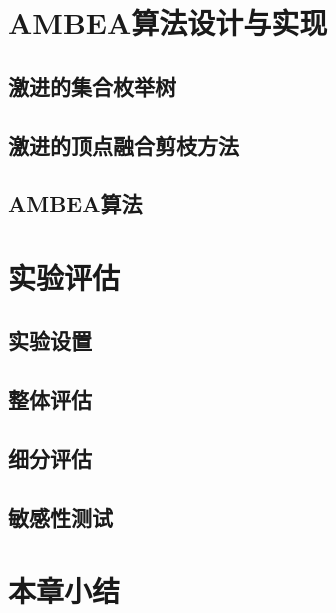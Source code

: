 \section{AMBEA算法设计与实现}

\subsection{激进的集合枚举树}

\subsection{激进的顶点融合剪枝方法}

\subsection{AMBEA算法}

\section{实验评估}

\subsection{实验设置}

\subsection{整体评估}

\subsection{细分评估}

\subsection{敏感性测试}

\section{本章小结}